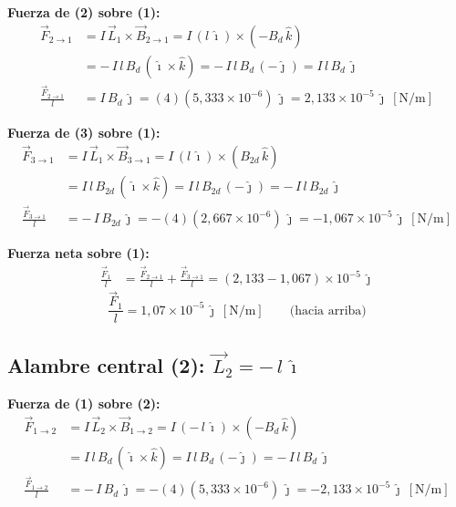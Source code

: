 \documentclass[12pt,letterpaper]{article}
\begin{document}
\noindent\textbf{Fuerza de (2) sobre (1):}
\begin{align*}
    \vec{F}_{2\to1} &= I\,\vec{L}_1\times\vec{B}_{2\to1}
                     = I\,(l\,\hat{\imath})\times(-B_d\,\hat{k})\\[3pt]
                    &= -\,I\,l\,B_d\,(\hat{\imath}\times\hat{k})
                     = -\,I\,l\,B_d\,(-\hat{\jmath})
                     = I\,l\,B_d\,\hat{\jmath}\\[3pt]
    \frac{\vec{F}_{2\to1}}{l} &= I\,B_d\,\hat{\jmath}
                     = (4)(5{,}333\times10^{-6})\,\hat{\jmath}
                     = 2{,}133\times10^{-5}\,\hat{\jmath}\ [\text{N/m}]
\end{align*}

\noindent\textbf{Fuerza de (3) sobre (1):}
\begin{align*}
    \vec{F}_{3\to1} &= I\,\vec{L}_1\times\vec{B}_{3\to1}
                     = I\,(l\,\hat{\imath})\times(B_{2d}\,\hat{k})\\[3pt]
                    &= I\,l\,B_{2d}\,(\hat{\imath}\times\hat{k})
                     = I\,l\,B_{2d}\,(-\hat{\jmath})
                     = -\,I\,l\,B_{2d}\,\hat{\jmath}\\[3pt]
    \frac{\vec{F}_{3\to1}}{l} &= -\,I\,B_{2d}\,\hat{\jmath}
                     = -(4)(2{,}667\times10^{-6})\,\hat{\jmath}
                     = -1{,}067\times10^{-5}\,\hat{\jmath}\ [\text{N/m}]
\end{align*}

\noindent\textbf{Fuerza neta sobre (1):}
\begin{align*}
    \frac{\vec{F}_1}{l} &= \frac{\vec{F}_{2\to1}}{l} + \frac{\vec{F}_{3\to1}}{l}
                         = (2{,}133 - 1{,}067)\times10^{-5}\,\hat{\jmath}
\end{align*}
\[
    \boxed{\frac{\vec{F}_1}{l} = 1{,}07\times10^{-5}\,\hat{\jmath}\ [\text{N/m}]
    \qquad\text{(hacia arriba)}}
\]

\subsection*{Alambre central (2):\; $\vec{L}_2 = -\,l\,\hat{\imath}$}

\noindent\textbf{Fuerza de (1) sobre (2):}
\begin{align*}
    \vec{F}_{1\to2} &= I\,\vec{L}_2\times\vec{B}_{1\to2}
                     = I\,(-\,l\,\hat{\imath})\times(-B_d\,\hat{k})\\[3pt]
                    &= I\,l\,B_d\,(\hat{\imath}\times\hat{k})
                     = I\,l\,B_d\,(-\hat{\jmath})
                     = -\,I\,l\,B_d\,\hat{\jmath}\\[3pt]
    \frac{\vec{F}_{1\to2}}{l} &= -\,I\,B_d\,\hat{\jmath}
                     = -(4)(5{,}333\times10^{-6})\,\hat{\jmath}
                     = -2{,}133\times10^{-5}\,\hat{\jmath}\ [\text{N/m}]
\end{align*}
\end{document}
